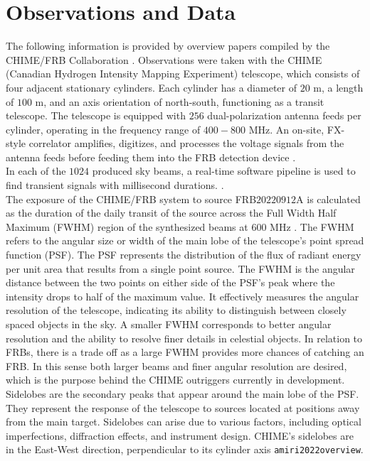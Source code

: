 \documentclass[twocolumn]{aastex631}
\begin{document}
\section{Observations and Data}
\label{sec:Observations_and_data}
The following information is provided by overview papers compiled by the CHIME/FRB Collaboration \citep{amiri2018chime, amiri2022overview}. Observations were taken with the CHIME (Canadian Hydrogen Intensity Mapping Experiment) telescope, which consists of four adjacent stationary cylinders. Each cylinder has a diameter of $20$ m, a length of $100$ m, and an axis orientation of north-south, functioning as a transit telescope. The telescope is equipped with $256$ dual-polarization antenna feeds per cylinder, operating in the frequency range of $400-800$ MHz. An on-site, FX-style correlator amplifies, digitizes, and processes the voltage signals from the antenna feeds before feeding them into the FRB detection device \citep{andersen2019chime}.\\
\indent In each of the $1024$ produced sky beams, a real-time software pipeline is used to find transient signals with millisecond durations. \citep{andersen2019chime}.\\
\indent The exposure of the CHIME/FRB system to source FRB$20220912$A is calculated as the duration of the daily transit of the source across the Full Width Half Maximum (FWHM) region of the synthesized beams at $600$ MHz \citep{andersen2019chime}. The FWHM refers to the angular size or width of the main lobe of the telescope's point spread function (PSF). The PSF represents the distribution of the flux of radiant energy per unit area that results from a single point source. The FWHM is the angular distance between the two points on either side of the PSF's peak where the intensity drops to half of the maximum value. It effectively measures the angular resolution of the telescope, indicating its ability to distinguish between closely spaced objects in the sky. A smaller FWHM corresponds to better angular resolution and the ability to resolve finer details in celestial objects. In relation to FRBs, there is a trade off as a large FWHM provides more chances of catching an FRB. In this sense both larger beams and finer angular resolution are desired, which is the purpose behind the CHIME outriggers currently in development. Sidelobes are the secondary peaks that appear around the main lobe of the PSF. They represent the response of the telescope to sources located at positions away from the main target. Sidelobes can arise due to various factors, including optical imperfections, diffraction effects, and instrument design. CHIME’s sidelobes are in the East-West direction, perpendicular to its cylinder axis \texttt{amiri2022overview}.\\
\end{document}
